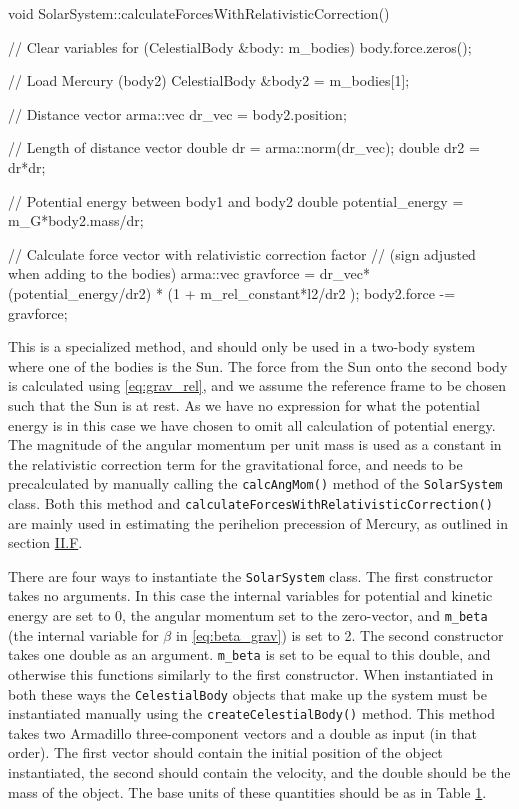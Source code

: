 \documentclass[reprint,english,notitlepage]{revtex4-1}  %
\begin{document}
\begin{cpp}
void SolarSystem::calculateForcesWithRelativisticCorrection() {
  // Clear variables
  for (CelestialBody &body: m_bodies) {
    body.force.zeros();
  }

  // Load Mercury (body2)
  CelestialBody &body2 = m_bodies[1];

  // Distance vector
  arma::vec dr_vec = body2.position;

  // Length of distance vector
  double dr = arma::norm(dr_vec);
  double dr2 = dr*dr;

  // Potential energy between body1 and body2
  double potential_energy = m_G*body2.mass/dr;

  // Calculate force vector with relativistic correction factor
  // (sign adjusted when adding to the bodies)
  arma::vec gravforce = dr_vec*(potential_energy/dr2)
  						* (1 + m_rel_constant*l2/dr2 );
  body2.force -= gravforce;
}
\end{cpp}

This is a specialized method, and should only be used in a two-body system where one of the bodies is the Sun. The force from the Sun onto the second body is calculated using \eqref{eq:grav_rel}, and we assume the reference frame to be chosen such that the Sun is at rest. As we have no expression for what the potential energy is in this case we have chosen to omit all calculation of potential energy. The magnitude of the angular momentum per unit mass is used as a constant in the relativistic correction term for the gravitational force, and needs to be precalculated by manually calling the \verb+calcAngMom()+ method of the \verb+SolarSystem+ class. Both this method and \verb+calculateForcesWithRelativisticCorrection()+ are mainly used in estimating the perihelion precession of Mercury, as outlined in section \hyperref[sec:II:f]{II.F}.

There are four ways to instantiate the \verb+SolarSystem+ class. The first constructor takes no arguments. In this case the internal variables for potential and kinetic energy are set to 0, the angular momentum set to the zero-vector, and \verb+m_beta+ (the internal variable for $\beta$ in \eqref{eq:beta_grav}) is set to 2. The second constructor takes one double as an argument. \verb+m_beta+ is set to be equal to this double, and otherwise this functions similarly to the first constructor. When instantiated in both these ways the \verb+CelestialBody+ objects that make up the system must be instantiated manually using the \verb+createCelestialBody()+ method. This method takes two Armadillo \citep{Armadillo} three-component vectors and a double as input (in that order). The first vector should contain the initial position of the object instantiated, the second should contain the velocity, and the double should be the mass of the object. The base units of these quantities should be as in Table \hyperref[table:III:a:i]{1}. \newline
\end{document}
